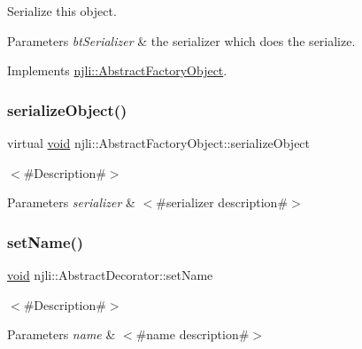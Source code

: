 Serialize this object.


\begin{DoxyParams}{Parameters}
{\em bt\+Serializer} & the serializer which does the serialize. \\
\hline
\end{DoxyParams}


Implements \mbox{\hyperlink{classnjli_1_1_abstract_factory_object_aad2fbe86fb3bdecf02918a96b9c57976}{njli\+::\+Abstract\+Factory\+Object}}.

\mbox{\label{classnjli_1_1_thread_a4fc4bcd9d1930911474210c047372fc0}} 
\subsubsection{\texorpdfstring{serialize\+Object()}{serializeObject()}}
{\footnotesize\ttfamily virtual \mbox{\hyperlink{_thread_8h_af1e856da2e658414cb2456cb6f7ebc66}{void}} njli\+::\+Abstract\+Factory\+Object\+::serialize\+Object}

$<$\#\+Description\#$>$


\begin{DoxyParams}{Parameters}
{\em serializer} & $<$\#serializer description\#$>$ \\
\hline
\end{DoxyParams}
\mbox{\label{classnjli_1_1_thread_a087eb5f8d9f51cc476f12f1d10a3cb95}} 
\subsubsection{\texorpdfstring{set\+Name()}{setName()}}
{\footnotesize\ttfamily \mbox{\hyperlink{_thread_8h_af1e856da2e658414cb2456cb6f7ebc66}{void}} njli\+::\+Abstract\+Decorator\+::set\+Name}

$<$\#\+Description\#$>$


\begin{DoxyParams}{Parameters}
{\em name} & $<$\#name description\#$>$ \\
\hline
\end{DoxyParams}
\mbox{\label{classnjli_1_1_thread_a644871703e3eaa5f500f8ee9d38e64b9}} 
